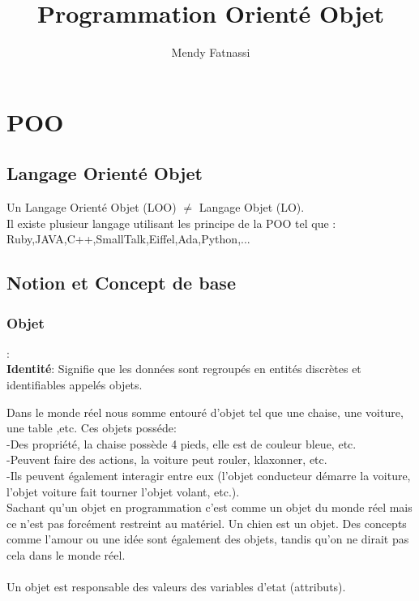 \documentclass[a4paper,12pt,openany]{book}
\author{Mendy Fatnassi}
\title{Programmation Orienté Objet}
\begin{document}
\maketitle
\tableofcontents

\chapter{POO}


\section{Langage Orienté Objet}

\begin{flushleft}
Un Langage Orienté Objet (LOO) $\neq$ Langage Objet (LO).\\
Il existe plusieur langage utilisant les principe de la POO tel que : Ruby,JAVA,C++,SmallTalk,Eiffel,Ada,Python,...\\
\end{flushleft}


\section{Notion et Concept de base}

\subsection{Objet}: \\

\textbf{Identité}: Signifie que les données sont regroupés en entités discrètes et identifiables appelés objets.\\

\begin{flushleft}
Dans le monde réel nous somme entouré d'objet tel que une chaise, une voiture, une table ,etc. Ces objets posséde:\\
-Des propriété, la chaise possède 4 pieds, elle est de couleur bleue, etc.\\
-Peuvent faire des actions, la voiture peut rouler, klaxonner, etc.\\
-Ils peuvent également interagir entre eux (l’objet conducteur démarre la voiture, l’objet voiture fait tourner l’objet volant, etc.).\\
Sachant qu’un objet en programmation c’est comme un objet du monde réel mais ce n’est pas forcément restreint au matériel. Un chien est un objet. Des concepts comme l’amour ou une idée sont également des objets, tandis qu’on ne dirait pas cela dans le monde réel.\\
\\
Un objet est responsable des valeurs des variables d'etat (attributs).\\
\end{flushleft}
\end{document}
